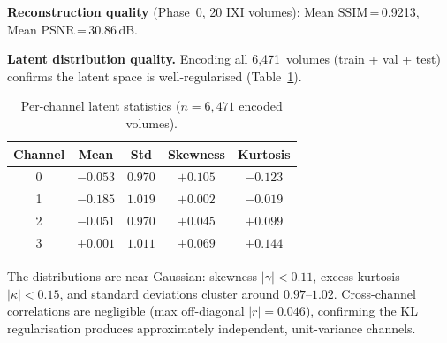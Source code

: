 \textbf{Reconstruction quality} (Phase~0, 20 IXI volumes): Mean SSIM\,=\,0.9213,
Mean PSNR\,=\,30.86\,dB.

\textbf{Latent distribution quality.}  Encoding all 6,471~volumes (train + val
+ test) confirms the latent space is well-regularised
(Table~\ref{tab:latent_stats}).

\begin{table}[ht]
\centering
\caption{Per-channel latent statistics ($n = 6{,}471$ encoded volumes).}
\label{tab:latent_stats}
\begin{tabular}{ccccc}
\toprule
\textbf{Channel} & \textbf{Mean} & \textbf{Std} & \textbf{Skewness} & \textbf{Kurtosis} \\
\midrule
0 & $-0.053$ & $0.970$ & $+0.105$ & $-0.123$ \\
1 & $-0.185$ & $1.019$ & $+0.002$ & $-0.019$ \\
2 & $-0.051$ & $0.970$ & $+0.045$ & $+0.099$ \\
3 & $+0.001$ & $1.011$ & $+0.069$ & $+0.144$ \\
\bottomrule
\end{tabular}
\end{table}

The distributions are near-Gaussian: skewness $|\gamma| < 0.11$, excess
kurtosis $|\kappa| < 0.15$, and standard deviations cluster around
$0.97$--$1.02$.  Cross-channel correlations are negligible
(max off-diagonal $|r| = 0.046$), confirming the KL regularisation produces
approximately independent, unit-variance channels.
